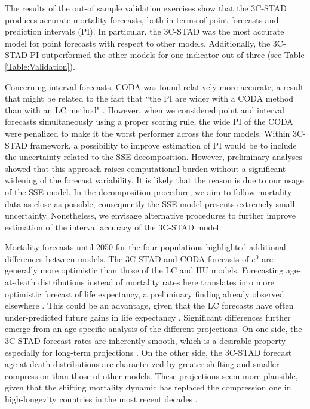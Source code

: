 \documentclass[11pt, a4paper]{article}
\begin{document}
The results of the out-of sample validation exercises show that the 3C-STAD produces accurate mortality forecasts, both in terms of point forecasts and prediction intervals (PI). In particular, the 3C-STAD was the most accurate model for point forecasts with respect to other models. Additionally, the 3C-STAD PI outperformed the other models for one indicator out of {\color{red}three} (see Table \ref{Table:Validation}). 

Concerning interval forecasts, CODA was found relatively more accurate, a result that might be related to the fact that ``the PI are wider with a CODA method than with an LC method" \cite[][p.~546]{bergeron2017coherent}. {\color{red}However, when we considered point and interval forecasts simultaneously using a proper scoring rule, the wide PI of the CODA were penalized to make it the worst performer across the four models.} Within 3C-STAD framework, a possibility to improve estimation of PI would be to include the uncertainty related to the SSE decomposition. However, preliminary analyses showed that this approach raises computational burden without a significant widening of the forecast variability. It is likely that the reason is due to our usage of the SSE model. In the decomposition procedure, we aim to follow mortality data as close as possible, consequently the SSE model presents extremely small uncertainty. Nonetheless, we envisage alternative procedures to further improve estimation of the interval accuracy of the 3C-STAD model.

Mortality forecasts until 2050 for the four populations highlighted additional differences between models. The 3C-STAD and CODA forecasts of $e^{0}$ are generally more optimistic than those of the LC and HU models. Forecasting age-at-death distributions instead of mortality rates here translates into more optimistic forecast of life expectancy, a preliminary finding already observed elsewhere \citep{bergeron2017what}. This could be an advantage, given that the LC forecasts have often under-predicted future gains in life expectancy \citep{lee2001evaluating}. Significant differences further emerge from an age-specific analysis of the different projections. On one side, the 3C-STAD forecast rates are inherently smooth, which is a desirable property especially for long-term projections \citep{li2013extending}. On the other side, the 3C-STAD forecast age-at-death distributions are characterized by greater shifting and smaller compression than those of other models. These projections seem more plausible, given that the shifting mortality dynamic has replaced the compression one in high-longevity countries in the most recent decades \citep{canudas2008modal,bergeron2015decomposing,janssen2019timing}. 
 
\end{document}
